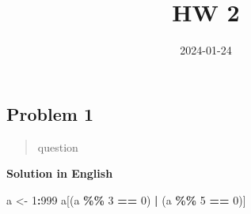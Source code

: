 \documentclass[
]{article}
\title{HW 2}
\author{}
\date{\vspace{-2.5em}2024-01-24}
\newenvironment{Shaded}{\begin{snugshade}}{\end{snugshade}}
\newcommand{\DecValTok}[1]{\textcolor[rgb]{0.00,0.00,0.81}{#1}}
\newcommand{\NormalTok}[1]{#1}
\newcommand{\OtherTok}[1]{\textcolor[rgb]{0.56,0.35,0.01}{#1}}
\newcommand{\SpecialCharTok}[1]{\textcolor[rgb]{0.81,0.36,0.00}{\textbf{#1}}}
\begin{document}
\maketitle

\hypertarget{problem-1}{%
\subsection{Problem 1}\label{problem-1}}

\begin{quote}
question
\end{quote}

\textbf{Solution in English}

\begin{Shaded}
\begin{Highlighting}[]
\NormalTok{a }\OtherTok{\textless{}{-}} \DecValTok{1}\SpecialCharTok{:}\DecValTok{999}
\NormalTok{a[(a }\SpecialCharTok{\%\%} \DecValTok{3} \SpecialCharTok{==} \DecValTok{0}\NormalTok{) }\SpecialCharTok{|}\NormalTok{ (a }\SpecialCharTok{\%\%} \DecValTok{5} \SpecialCharTok{==} \DecValTok{0}\NormalTok{)]}
\end{Highlighting}
\end{Shaded}
\end{document}
